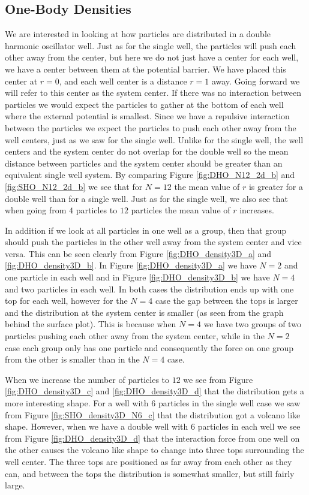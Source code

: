 \documentclass[../main.tex]{subfiles}
\begin{document}
\subsection{One-Body Densities}

We are interested in looking at how particles are distributed in a double harmonic oscillator well. Just as for the single well, the particles will push each other away from the center, but here we do not just have a center for each well, we have a center between them at the potential barrier. We have placed this center at $r=0$, and each well center is a distance $r=1$ away. Going forward we will refer to this center as the system center. If there was no interaction between particles we would expect the particles to gather at the bottom of each well where the external potential is smallest. Since we have a repulsive interaction between the particles we expect the particles to push each other away from the well centers, just as we saw for the single well. Unlike for the single well, the well centers and the system center do not overlap for the double well so the mean distance between particles and the system center should be greater than an equivalent single well system. By comparing Figure \ref{fig:DHO_N12_2d_b} and \ref{fig:SHO_N12_2d_b} we see that for $N=12$ the mean value of $r$ is greater for a double well than for a single well. Just as for the single well, we also see that when going from $4$ particles to $12$ particles the mean value of $r$ increases.

In addition if we look at all particles in one well as a group, then that group should push the particles in the other well away from the system center and vice versa. This can be seen clearly from Figure \ref{fig:DHO_density3D_a} and \ref{fig:DHO_density3D_b}. In Figure \ref{fig:DHO_density3D_a} we have $N=2$ and one particle in each well and in Figure \ref{fig:DHO_density3D_b} we have $N=4$ and two particles in each well. In both cases the distribution ends up with one top for each well, however for the $N=4$ case the gap between the tops is larger and the distribution at the system center is smaller (as seen from the graph behind the surface plot). This is because when $N=4$ we have two groups of two particles pushing each other away from the system center, while in the $N=2$ case each group only has one particle and consequently the force on one group from the other is smaller than in the $N=4$ case.

When we increase the number of particles to $12$ we see from Figure \ref{fig:DHO_density3D_c} and \ref{fig:DHO_density3D_d} that the distribution gets a more interesting shape. For a well with $6$ particles in the single well case we saw from Figure \ref{fig:SHO_density3D_N6_c} that the distribution got a volcano like shape. However, when we have a double well with $6$ particles in each well we see from Figure \ref{fig:DHO_density3D_d} that the interaction force from one well on the other causes the volcano like shape to change into three tops surrounding the well center. The three tops are positioned as far away from each other as they can, and between the tops the distribution is somewhat smaller, but still fairly large.
\end{document}

